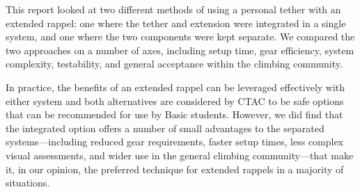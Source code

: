 \documentclass[nonacm,acmtog]{acmart}
\begin{document}
   This report looked at two different methods of using a personal tether with
   an extended rappel: one where the tether and extension were integrated in a
   single system, and one where the two components were kept separate.  We
   compared the two approaches on a number of axes, including setup time, gear
   efficiency, system complexity, testability, and general acceptance within
   the climbing community.

   In practice, the benefits of an extended rappel can be leveraged effectively
   with either system and both alternatives are considered by CTAC to be safe
   options that can be recommended for use by Basic students.  However, we did
   find that the integrated option offers a number of small advantages to the
   separated systems---including reduced gear requirements, faster setup times,
   less complex visual assessments, and wider use in the general climbing
   community---that make it, in our opinion, the preferred technique for
   extended rappels in a majority of situations.





\end{document}
